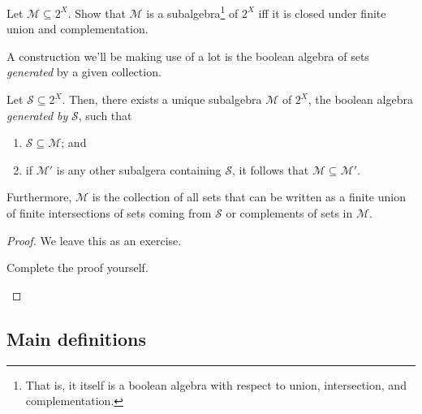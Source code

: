 \begin{exr}
Let $\mathcal{M}\subseteq 2^X$.  Show that $\mathcal{M}$ is a subalgebra\footnote{That is, it itself is a boolean algebra with respect to union, intersection, and complementation.} of $2^X$ iff it is closed under finite union and complementation.
\end{exr}
A construction we'll be making use of a lot is the boolean algebra of sets \emph{generated} by a given collection.
\begin{prp}
Let $\mathcal{S}\subseteq 2^X$.  Then, there exists a unique subalgebra $\mathcal{M}$ of $2^X$, the boolean algebra \emph{generated by} $\mathcal{S}$, such that
\begin{enumerate}
\item $\mathcal{S}\subseteq \mathcal{M}$; and
\item if $\mathcal{M}'$ is any other subalgera containing $\mathcal{S}$, it follows that $\mathcal{M}\subseteq \mathcal{M}'$.
\end{enumerate}
Furthermore, $\mathcal{M}$ is the collection of all sets that can be written as a finite union of finite intersections of sets coming from $\mathcal{S}$ or complements of sets in $\mathcal{M}$.
\begin{proof}
We leave this as an exercise.
\begin{exr}
Complete the proof yourself.
\end{exr}
\end{proof}
\end{prp}

\subsection{Main definitions}

